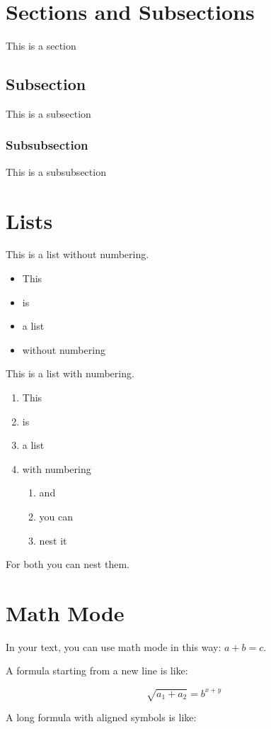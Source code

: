 \documentclass{article}[12pt]
\begin{document}
\date{}
\section{Sections and Subsections}
This is a section
\subsection{Subsection}
This is a subsection
\subsubsection{Subsubsection}
This is a subsubsection

\section{Lists}
This is a list without numbering.
\begin{itemize}
  \item This
  \item is
  \item a list
  \item without numbering
\end{itemize}

This is a list with numbering.

\begin{enumerate}
  \item This
  \item is
  \item a list
  \item with numbering
  \begin{enumerate}
    \item and
    \item you can
    \item nest it
  \end{enumerate}
\end{enumerate}

For both you can nest them.

\section{Math Mode}
In your text, you can use math mode in this way: $a+b=c$.

A formula starting from a new line is like:

$$\sqrt{a_1+a_2}=b^{x+y}$$

A long formula with aligned symbols is like:
\end{document}
